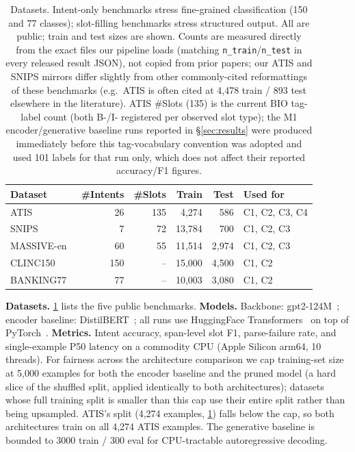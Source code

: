 \documentclass{article}
\begin{document}
\begin{table}[t]\centering
\caption{Datasets. Intent-only benchmarks stress fine-grained classification
(150 and 77 classes); slot-filling benchmarks stress structured output. All are
public; train and test sizes are shown. Counts are measured directly from the
exact files our pipeline loads (matching \texttt{n\_train}/\texttt{n\_test} in
every released result JSON), not copied from prior papers; our ATIS and SNIPS
mirrors differ slightly from other commonly-cited reformattings of these
benchmarks (e.g.\ ATIS is often cited at 4{,}478 train / 893 test elsewhere in
the literature). ATIS \#Slots (135) is the current BIO tag-label count (both
B-/I- registered per observed slot type); the M1 encoder/generative baseline
runs reported in \S\ref{sec:results} were produced immediately before this
tag-vocabulary convention was adopted and used 101 labels for that run only,
which does not affect their reported accuracy/F1 figures.}
\label{tab:datasets}
\small
\begin{tabular}{lrrrrl}
\toprule
Dataset & \#Intents & \#Slots & Train & Test & Used for\\
\midrule
ATIS~\citep{hemphill1990atis} & 26 & 135 & 4{,}274 & 586 & C1, C2, C3, C4\\
SNIPS~\citep{coucke2018snips} & 7 & 72 & 13{,}784 & 700 & C1, C2, C3\\
MASSIVE-en~\citep{fitzgerald2023massive} & 60 & 55 & 11{,}514 & 2{,}974 & C1, C2, C3\\
CLINC150~\citep{larson2019clinc} & 150 & -- & 15{,}000 & 4{,}500 & C1, C2\\
BANKING77~\citep{casanueva2020banking77} & 77 & -- & 10{,}003 & 3{,}080 & C1, C2\\
\bottomrule
\end{tabular}
\end{table}

\textbf{Datasets.} \cref{tab:datasets} lists the five public benchmarks.
\textbf{Models.} Backbone: gpt2-124M~\citep{radford2019gpt2}; encoder baseline:
DistilBERT~\citep{sanh2019distilbert}; all runs use HuggingFace
Transformers~\citep{wolf2020transformers} on top of
PyTorch~\citep{paszke2019pytorch}. \textbf{Metrics.} Intent accuracy,
span-level slot F1, parse-failure rate, and single-example P50 latency on a
commodity CPU (Apple Silicon arm64, 10 threads). For fairness across the
architecture comparison we cap training-set size at 5{,}000 examples for both
the encoder baseline and the pruned model (a hard slice of the shuffled
split, applied identically to both architectures); datasets whose full
training split is smaller than this cap use their entire split rather than
being upsampled. ATIS's split (4{,}274 examples, \cref{tab:datasets}) falls
below the cap, so both architectures train on all 4{,}274 ATIS examples. The
generative baseline is bounded to 3000 train / 300 eval for CPU-tractable
autoregressive decoding.
\end{document}
